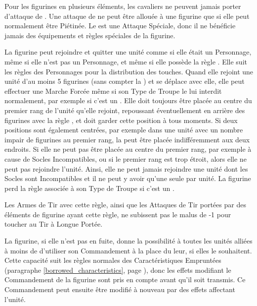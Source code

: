 Pour les figurines en plusieurs éléments, les cavaliers ne peuvent jamais porter d'attaque de \stomp{}. Une attaque de \stomp{} ne peut être allouée à une figurine que si elle peut normalement être Piétinée. Le \stomp{} est une Attaque Spéciale, donc il ne bénéficie jamais des équipements et règles spéciales de la figurine.

\label{warplatform}

La figurine peut rejoindre et quitter une unité comme si elle était un Personnage, même si elle n'est pas un Personnage, et même si elle possède la règle \toweringpresence{}. Elle suit les règles des Personnages pour la distribution des touches. Quand elle rejoint une unité d'au moins 5 figurines (sans compter la \warplatform{}) et se déplace avec elle, elle peut effectuer une Marche Forcée même si son Type de Troupe le lui interdit normalement, par exemple si c'est un \chariot{}. Elle doit toujours être placée au centre du premier rang de l'unité qu'elle rejoint, repoussant éventuellement en arrière des figurines avec la règle \frontrank{}, et doit garder cette position à tous moments. Si deux positions sont également centrées, par exemple dans une unité avec un nombre impair de figurines au premier rang, la \warplatform{} peut être placée indifféremment aux deux endroits. Si elle ne peut pas être placée au centre du premier rang, par exemple à cause de Socles Incompatibles, ou si le premier rang est trop étroit, alors elle ne peut pas rejoindre l'unité. Ainsi, elle ne peut jamais rejoindre une unité dont les Socles sont Incompatibles et il ne peut y avoir qu'une seule \warplatform{} par unité. La figurine perd la règle \swiftstride{} associée à son Type de Troupe si c'est un \chariot{}.


Les Armes de Tir avec cette règle, ainsi que les Attaques de Tir portées par des éléments de figurine ayant cette règle, ne subissent pas le malus de -1 pour toucher au Tir à Longue Portée.


La figurine, si elle n'est pas en fuite, donne la possibilité à toutes les unités alliées à moins de  d'utiliser son Commandement à la place du leur, si elles le souhaitent. Cette capacité suit les règles normales des Caractéristiques Empruntées (paragraphe \ref{borrowed_characteristics}, page \pageref{borrowed_characteristics}), donc les effets modifiant le Commandement de la figurine sont pris en compte avant qu'il soit transmis. Ce Commandement peut ensuite être modifié à nouveau par des effets affectant l'unité.


